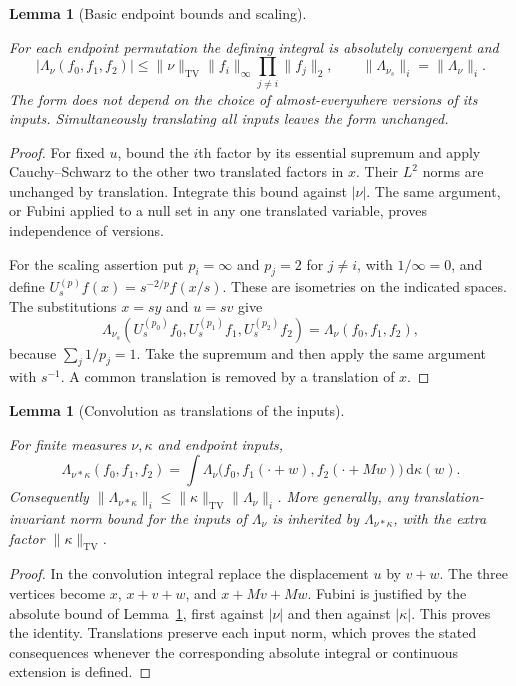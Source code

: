 \documentclass[11pt]{amsart}
\newcommand{\dd}{\,\mathrm d}
\DeclareMathOperator{\TV}{TV}
\newtheorem{lemma}[theorem]{Lemma}
\theoremstyle{definition}
\theoremstyle{remark}
\numberwithin{equation}{section}
\providecommand{\lean}[1]{}
\providecommand{\leanok}{}
\begin{document}
\begin{lemma}[Basic endpoint bounds and scaling]\label{lem:form-basic}
\lean{Auto.lem_form_basic_integrable,Auto.lem_form_basic_bound,Auto.lem_form_basic_scaling,Auto.lem_form_basic_ae,Auto.lem_form_basic_translate}
\leanok
For each endpoint permutation the defining integral is absolutely
convergent and
\[
 |\Lambda_\nu(f_0,f_1,f_2)|
 \le\|\nu\|_{\TV}\|f_i\|_\infty\prod_{j\ne i}\|f_j\|_2,
 \qquad
 \|\Lambda_{\nu_s}\|_i=\|\Lambda_\nu\|_i.
\]
The form does not depend on the choice of almost-everywhere versions
of its inputs.  Simultaneously translating all inputs leaves the
form unchanged.
\end{lemma}
\begin{proof}
For fixed $u$, bound the $i$th factor by its essential supremum
and apply Cauchy--Schwarz to the other two translated factors in
$x$.  Their $L^2$ norms are unchanged by translation.  Integrate
this bound against $|\nu|$.  The same argument, or Fubini applied
to a null set in any one translated variable, proves independence
of versions.

For the scaling assertion put $p_i=\infty$ and $p_j=2$ for
$j\ne i$, with $1/\infty=0$, and define
$U_s^{(p)}f(x)=s^{-2/p}f(x/s)$.  These are isometries on the
indicated spaces.  The substitutions $x=sy$ and $u=sv$ give
\[
 \Lambda_{\nu_s}(U_s^{(p_0)}f_0,U_s^{(p_1)}f_1,
                   U_s^{(p_2)}f_2)=\Lambda_\nu(f_0,f_1,f_2),
\]
because $\sum_j1/p_j=1$.  Take the supremum and then apply the
same argument with $s^{-1}$.  A common translation is removed
by a translation of $x$.
\end{proof}

\begin{lemma}[Convolution as translations of the inputs]\label{lem:convolution-translate}
\lean{Auto.lem_convolution_translate,Auto.lem_convolution_translate_norm,Auto.lem_convolution_translate_general}
\leanok
For finite measures $\nu,\kappa$ and endpoint inputs,
\begin{equation}\label{eq:convolution-translate}
 \Lambda_{\nu*\kappa}(f_0,f_1,f_2)
 =\int\Lambda_\nu\big(f_0,f_1(\cdot+w),f_2(\cdot+Mw)\big)
       \dd\kappa(w).
\end{equation}
Consequently
$\|\Lambda_{\nu*\kappa}\|_i
 \le\|\kappa\|_{\TV}\|\Lambda_\nu\|_i$.
More generally, any translation-invariant norm bound for the
inputs of $\Lambda_\nu$ is inherited by $\Lambda_{\nu*\kappa}$,
with the extra factor $\|\kappa\|_{\TV}$.
\end{lemma}
\begin{proof}
In the convolution integral replace the displacement $u$ by
$v+w$.  The three vertices become $x$, $x+v+w$, and
$x+Mv+Mw$.  Fubini is justified by the absolute bound of
Lemma~\ref{lem:form-basic}, first against $|\nu|$ and then
against $|\kappa|$.  This proves the identity.  Translations
preserve each input norm, which proves the stated consequences
whenever the corresponding absolute integral or continuous
extension is defined.
\end{proof}
\end{document}
